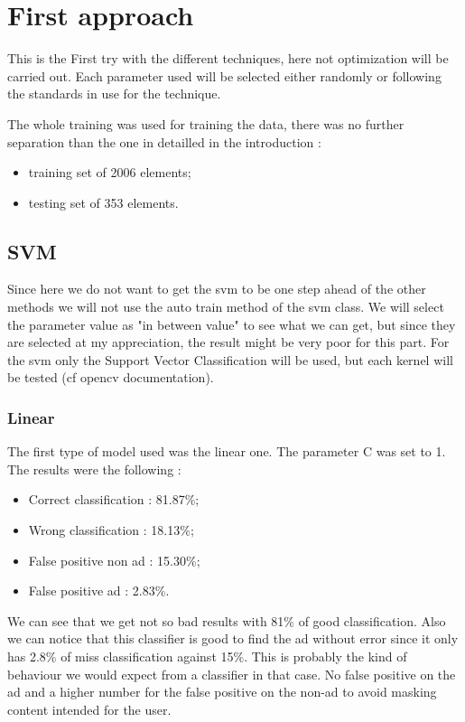 \section{First approach}

This is the First try with the different techniques, here not optimization will be carried out. Each parameter used will be selected either randomly or following the standards in use for the technique.

The whole training was used for training the data, there was no further separation than the one in detailled in the introduction :
\begin{itemize}
  \item training set of 2006 elements;
  \item testing set of 353 elements.
\end{itemize}

\subsection{SVM}

Since here we do not want to get the svm to be one step ahead of the other methods we will not use the auto train method of the svm class. We will select the parameter value as "in between value" to see what we can get, but since they are selected at my appreciation, the result might be very poor for this part.
For the svm only the Support Vector Classification will be used, but each kernel will be tested (cf opencv documentation).


\subsubsection{Linear}

The first type of model used was the linear one. The parameter C was set to 1. The results were the following :
\begin{itemize}
  \item Correct classification : 81.87\%;
  \item Wrong classification : 18.13\%;
  \item False positive non ad : 15.30\%;
  \item False positive ad : 2.83\%.
\end{itemize}

We can see that we get not so bad results with 81\% of good classification. Also we can notice that this classifier is good to find the ad without error since it only has 2.8\% of miss classification against 15\%. This is probably the kind of behaviour we would expect from a classifier in that case. No false positive on the ad and a higher number for the false positive on the non-ad to avoid masking content intended for the user.


